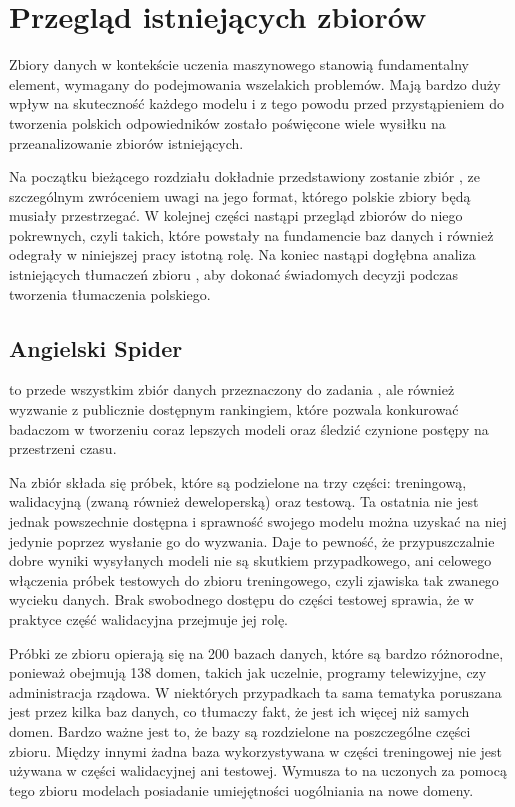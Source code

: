 \chapter{Przegląd istniejących zbiorów}
Zbiory danych w kontekście uczenia maszynowego stanowią fundamentalny element, wymagany do podejmowania wszelakich problemów. Mają bardzo duży wpływ na skuteczność każdego modelu i z tego powodu przed przystąpieniem do tworzenia polskich odpowiedników zostało poświęcone wiele wysiłku na przeanalizowanie zbiorów istniejących.

Na początku bieżącego rozdziału dokładnie przedstawiony zostanie zbiór , ze szczególnym zwróceniem uwagi na jego format, którego polskie zbiory będą musiały przestrzegać. W kolejnej części nastąpi przegląd zbiorów do niego pokrewnych, czyli takich, które powstały na fundamencie baz danych  i również odegrały w niniejszej pracy istotną rolę. Na koniec nastąpi dogłębna analiza istniejących tłumaczeń zbioru , aby dokonać świadomych decyzji podczas tworzenia tłumaczenia polskiego.

\section{Angielski Spider}
 to przede wszystkim zbiór danych przeznaczony do zadania , ale również wyzwanie z publicznie dostępnym rankingiem, które pozwala konkurować badaczom w tworzeniu coraz lepszych modeli oraz śledzić czynione postępy na przestrzeni czasu.

Na zbiór składa się  próbek, które są podzielone na trzy części: treningową, walidacyjną (zwaną również deweloperską) oraz testową. Ta ostatnia nie jest jednak powszechnie dostępna i sprawność swojego modelu można uzyskać na niej jedynie poprzez wysłanie go do wyzwania. Daje to pewność, że przypuszczalnie dobre wyniki wysyłanych modeli nie są skutkiem przypadkowego, ani celowego włączenia próbek testowych do zbioru treningowego, czyli zjawiska tak zwanego wycieku danych. Brak swobodnego dostępu do części testowej sprawia, że w praktyce część walidacyjna przejmuje jej rolę.

Próbki ze zbioru  opierają się na 200 bazach danych, które są bardzo różnorodne, ponieważ obejmują 138 domen, takich jak uczelnie, programy telewizyjne, czy administracja rządowa. W niektórych przypadkach ta sama tematyka poruszana jest przez kilka baz danych, co tłumaczy fakt, że jest ich więcej niż samych domen. Bardzo ważne jest to, że bazy są rozdzielone na poszczególne części zbioru. Między innymi żadna baza wykorzystywana w części treningowej nie jest używana w części walidacyjnej ani testowej. Wymusza to na uczonych za pomocą tego zbioru modelach posiadanie umiejętności uogólniania na nowe domeny.

